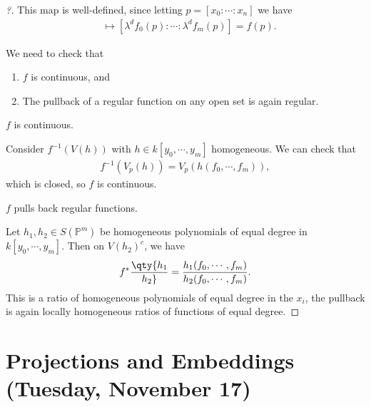 \begin{proof}[?]

This map is well-defined, since letting \(p = [x_0: \cdots : x_n]\) we
have
\begin{align*}  
[\lambda x_0 : \cdots : \lambda x_n] 
&\mapsto 
[ \lambda^d f_0(p) : \cdots : \lambda^d f_m(p)] 
= f(p)
.\end{align*}

We need to check that

\begin{enumerate}
\def\labelenumi{\arabic{enumi}.}
\item
  \(f\) is continuous, and
\item
  The pullback of a regular function on any open set is again regular.
\end{enumerate}

\begin{claim}

\(f\) is continuous.

\end{claim}

Consider \(f^{-1}(V(h))\) with \(h\in k[y_0, \cdots, y_m]\) homogeneous.
We can check that
\begin{align*}  
f^{-1}(V_p(h)) = V_p(h(f_0, \cdots, f_m))
,\end{align*}
which is closed, so \(f\) is continuous.

\begin{claim}

\(f\) pulls back regular functions.

\end{claim}

Let \(h_1, h_2 \in S({\mathbb{P}}^m)\) be homogeneous polynomials of
equal degree in \(k[y_0, \cdots, y_m]\). Then on \(V(h_2)^c\), we have
\begin{align*}  
f^*\qty{h_1 \over h_2 } = {h_1(f_0, \cdots, f_m) \over h_2(f_0, \cdots, f_m)}
.\end{align*}
This is a ratio of homogeneous polynomials of equal degree in the
\(x_i\), the pullback is again locally homogeneous ratios of functions
of equal degree.

\end{proof}

\hypertarget{projections-and-embeddings-tuesday-november-17}{%
\section{Projections and Embeddings (Tuesday, November
17)}\label{projections-and-embeddings-tuesday-november-17}}


